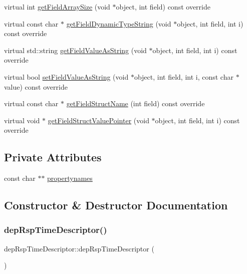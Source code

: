 \begin{DoxyCompactItemize}
virtual int \hyperlink{classdep_rsp_time_descriptor_a1250376ef742580dc83db84ce3bc2283}{get\+Field\+Array\+Size} (void $\ast$object, int field) const override
\item 
virtual const char $\ast$ \hyperlink{classdep_rsp_time_descriptor_a792f2bfcb1f116dd06437d885ff72f48}{get\+Field\+Dynamic\+Type\+String} (void $\ast$object, int field, int i) const override
\item 
virtual std\+::string \hyperlink{classdep_rsp_time_descriptor_acdc1e2c5d57b9ade8cdd45472ca82719}{get\+Field\+Value\+As\+String} (void $\ast$object, int field, int i) const override
\item 
virtual bool \hyperlink{classdep_rsp_time_descriptor_a33a783027f6e9c827228f9405f485f63}{set\+Field\+Value\+As\+String} (void $\ast$object, int field, int i, const char $\ast$value) const override
\item 
virtual const char $\ast$ \hyperlink{classdep_rsp_time_descriptor_a55d83a6906074344459de31d49e51e1d}{get\+Field\+Struct\+Name} (int field) const override
\item 
virtual void $\ast$ \hyperlink{classdep_rsp_time_descriptor_ad6ca81a9ae888ced8f540d844900f30d}{get\+Field\+Struct\+Value\+Pointer} (void $\ast$object, int field, int i) const override
\end{DoxyCompactItemize}
\subsection*{Private Attributes}
\begin{DoxyCompactItemize}
\item 
const char $\ast$$\ast$ \hyperlink{classdep_rsp_time_descriptor_aa00fe09f472957d38fb825d538d5c090}{propertynames}
\end{DoxyCompactItemize}


\subsection{Constructor \& Destructor Documentation}
\mbox{\label{classdep_rsp_time_descriptor_a1c9b594074be83beb7009019d66da91e}} 
\subsubsection{\texorpdfstring{dep\+Rsp\+Time\+Descriptor()}{depRspTimeDescriptor()}}
{\footnotesize\ttfamily dep\+Rsp\+Time\+Descriptor\+::dep\+Rsp\+Time\+Descriptor (\begin{DoxyParamCaption}{ }\end{DoxyParamCaption})}

